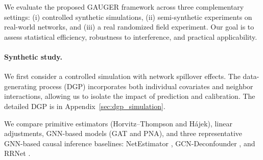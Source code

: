 \documentclass{article}
\theoremstyle{plain}
\theoremstyle{definition}
\theoremstyle{remark}
\begin{document}
We evaluate the proposed GAUGER framework across three complementary settings: (i) controlled synthetic simulations, (ii) semi-synthetic experiments on real-world networks, and (iii) a real randomized field experiment. Our goal is to assess statistical efficiency, robustness to interference, and practical applicability.

\paragraph{Synthetic study.}
We first consider a controlled simulation with network spillover effects. The data-generating process (DGP) incorporates both individual covariates and neighbor interactions, allowing us to isolate the impact of prediction and calibration. The detailed DGP is in Appendix~\ref{sec:dgp_simulation}.

We compare primitive estimators (Horvitz--Thompson and H\'{a}jek), linear adjustments, GNN-based models (GAT and PNA), and three representative GNN-based causal inference baselines: NetEstimator \citep{jiang2022estimating}, GCN-Deconfounder \citep{guo2020learning}, and RRNet \citep{cai2023generalization}.
\end{document}
